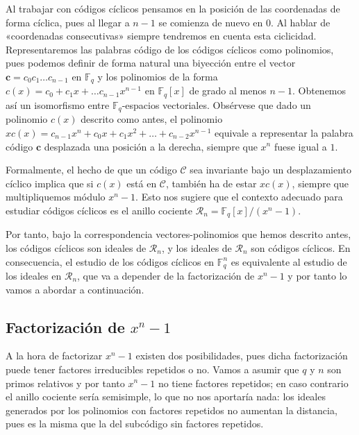 Al trabajar con códigos cíclicos pensamos en la posición de las coordenadas de forma cíclica, pues al llegar a \(n -1\) se comienza de nuevo en \(0\).
Al hablar de «coordenadas consecutivas» siempre tendremos en cuenta esta ciclicidad.
Representaremos las palabras código de los códigos cíclicos como polinomios, pues podemos definir de forma natural una biyección entre el vector \(\mathbf c = c_0c_1\dots c_{n-1}\) en \(\mathbb F_q\) y los polinomios de la forma \(c(x) = c_0 + c_1x + \dots c_{n-1}x^{n-1}\) en \(\mathbb F_q[x]\) de grado al menos \(n-1\). 
Obtenemos así un isomorfismo entre \(\mathbb F_q\)-espacios vectoriales.
Obsérvese que dado un polinomio \(c(x)\) descrito como antes, el polinomio \(xc(x) = c_{n-1}x^n + c_0x + c_1x^2 + \dots + c_{n-2}x^{n-1}\) equivale a representar la palabra código \(\mathbf c\) desplazada una posición a la derecha, siempre que \(x^n\) fuese igual a \(1\).

Formalmente, el hecho de que un código \(\mathcal C\) sea invariante bajo un desplazamiento cíclico implica que si \(c(x)\) está en \(\mathcal C\), también ha de estar \(xc(x)\), siempre que multipliquemos módulo \(x^n -1\). 
Esto nos sugiere que el contexto adecuado para estudiar códigos cíclicos es el anillo cociente \(\mathcal R_n = \mathbb F_q[x]/(x^n - 1)\).

Por tanto, bajo la correspondencia vectores-polinomios que hemos descrito antes, los códigos cíclicos son ideales de \(\mathcal R_n\), y los ideales de \(\mathcal R_n\) son códigos cíclicos.
En consecuencia, el estudio de los códigos cíclicos en \(\mathbb F_q^n\) es equivalente al estudio de los ideales en \(\mathcal R_n\), que va a depender de la factorización de \(x^n-1\) y por tanto lo vamos a abordar a continuación.

\subsection{Factorización de \texorpdfstring{\(x^n -1\)}{xn - 1}}

\label{sec:factorizacion-xn-1}

A la hora de factorizar \(x^n -1\) existen dos posibilidades, pues dicha factorización puede tener factores irreducibles repetidos o no.
Vamos a asumir que \(q\) y \(n\) son primos relativos y por tanto \(x^n - 1\) no tiene factores repetidos; en caso contrario el anillo cociente sería semisimple, lo que no nos aportaría nada: los ideales generados por los polinomios con factores repetidos no aumentan la distancia, pues es la misma que la del subcódigo sin factores repetidos.

